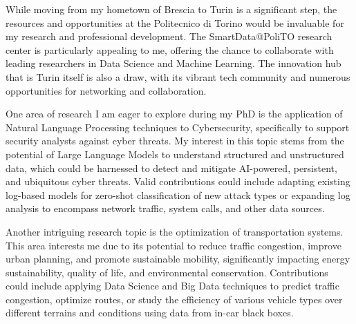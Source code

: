 While moving from my hometown of Brescia to Turin is a significant step, the resources and opportunities at the Politecnico di Torino would be invaluable for my research and professional development. The SmartData@PoliTO research center is particularly appealing to me, offering the chance to collaborate with leading researchers in Data Science and Machine Learning. The innovation hub that is Turin itself is also a draw, with its vibrant tech community and numerous opportunities for networking and collaboration. 

One area of research I am eager to explore during my PhD is the application of Natural Language Processing techniques to Cybersecurity, specifically to support security analysts against cyber threats. My interest in this topic stems from the potential of Large Language Models to understand structured and unstructured data, which could be harnessed to detect and mitigate AI-powered, persistent, and ubiquitous cyber threats. Valid contributions could include adapting existing log-based models for zero-shot classification of new attack types or expanding log analysis to encompass network traffic, system calls, and other data sources.

Another intriguing research topic is the optimization of transportation systems. This area interests me due to its potential to reduce traffic congestion, improve urban planning, and promote sustainable mobility, significantly impacting energy sustainability, quality of life, and environmental conservation. Contributions could include applying Data Science and Big Data techniques to predict traffic congestion, optimize routes, or study the efficiency of various vehicle types over different terrains and conditions using data from in-car black boxes.